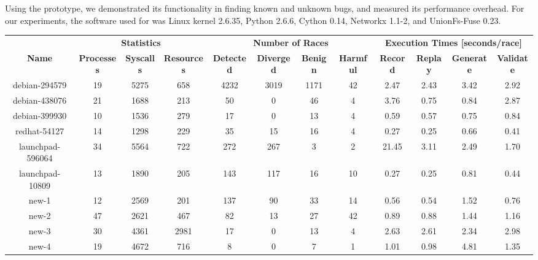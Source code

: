 Using the \racepro prototype, we demonstrated its functionality in finding
known and unknown bugs, and measured its performance overhead.  For
our experiments, the software used for \racepro was Linux kernel 2.6.35,
Python 2.6.6, Cython 0.14, Networkx 1.1-2, and UnionFs-Fuse 0.23.


\begin{table}
\centering
\setlength{\tabcolsep}{3pt}

\begin{tabular}{c|ccc|cccc|cccc}
{\bf } &
  \multicolumn{3}{|c}{\bf Statistics} &
  \multicolumn{4}{|c}{\bf Number of Races} &
  \multicolumn{4}{|c}{\bf Execution Times [seconds/race]} \\
{\bf Name} & {\bf Processes} & {\bf Syscalls} & {\bf Resources} & 
  {\bf Detected} & {\bf Diverged} & {\bf Benign} & {\bf Harmful} & 
  {\bf Record} & {\bf Replay} & {\bf Generate} & {\bf Validate} \\
\hline

debian-294579    &  19  &  5275  &  658   &  4232  &  3019  &  1171 &  42  &  2.47  &  2.43  &  3.42  &  2.92  \\
debian-438076    &  21  &  1688  &  213   &  50    &  0     &  46   &  4   &  3.76  &  0.75  &  0.84  &  2.87  \\
debian-399930    &  10  &  1536  &  279   &  17    &  0     &  13   &  4   &  0.59  &  0.57  &  0.75  &  0.84  \\
redhat-54127     &  14  &  1298  &  229   &  35    &  15    &  16   &  4   &  0.27  &  0.25  &  0.66  &  0.41  \\
launchpad-596064 &  34  &  5564  &  722   &  272   &  267   &  3    &  2   &  21.45 &  3.11  &  2.49  &  1.70  \\
launchpad-10809  &  13  &  1890  &  205   &  143   &  117   &  16   &  10  &  0.27  &  0.25  &  0.81  &  0.44  \\
new-1            &  12  &  2569  &  201   &  137   &  90    &  33   &  14  &  0.56  &  0.54  &  1.52  &  0.76  \\
new-2            &  47  &  2621  &  467   &  82    &  13    &  27   &  42  &  0.89  &  0.88  &  1.44  &  1.16  \\
new-3            &  30  &  4361  &  2981  &  17    &  0     &  13   &  4   &  2.63  &  2.61  &  2.34  &  2.98  \\
new-4            &  19  &  4672  &  716   &  8     &  0     &  7    &  1   &  1.01  &  0.98  &  4.81  &  1.35  \\


\end{tabular}
\end{table}
